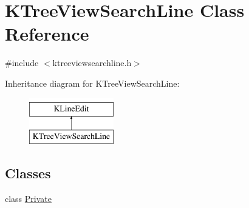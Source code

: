 \hypertarget{classKTreeViewSearchLine}{\section{K\+Tree\+View\+Search\+Line Class Reference}
\label{classKTreeViewSearchLine}
}


{\ttfamily \#include $<$ktreeviewsearchline.\+h$>$}

Inheritance diagram for K\+Tree\+View\+Search\+Line\+:\begin{figure}[H]
\begin{center}
\leavevmode
\includegraphics[height=2.000000cm]{classKTreeViewSearchLine}
\end{center}
\end{figure}
\subsection*{Classes}
\begin{DoxyCompactItemize}
\item 
class \hyperlink{classKTreeViewSearchLine_1_1Private}{Private}
\end{DoxyCompactItemize}
